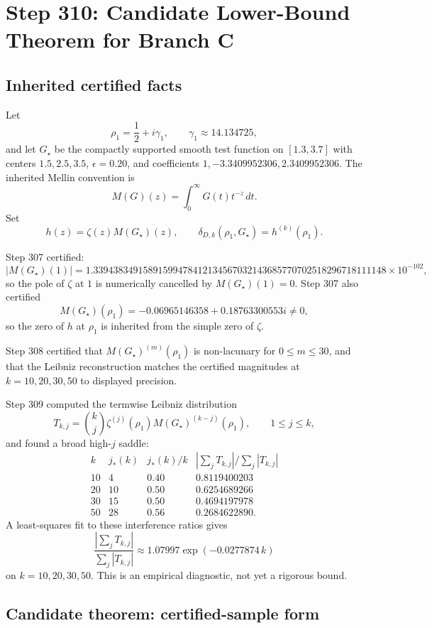 \section*{Step 310: Candidate Lower-Bound Theorem for Branch C}

\subsection*{Inherited certified facts}

Let
\[
  \rho_1 = \frac12+i\gamma_1,\qquad \gamma_1 \approx 14.134725,
\]
and let \(G_\star\) be the compactly supported smooth test function on
\([1.3,3.7]\) with centers \(1.5,2.5,3.5\), \(\epsilon=0.20\), and
coefficients \(1,-3.3409952306,2.3409952306\).  The inherited Mellin
convention is
\[
  M(G)(z)=\int_0^\infty G(t)t^{-z}\,dt.
\]
Set
\[
  h(z)=\zeta(z)M(G_\star)(z),\qquad
  \delta_{D,k}(\rho_1,G_\star)=h^{(k)}(\rho_1).
\]

Step 307 certified:
\[
  |M(G_\star)(1)|=
  1.33943834915891599478412134567032143685770702518296718111148
  \times 10^{-102},
\]
so the pole of \(\zeta\) at \(1\) is numerically cancelled by
\(M(G_\star)(1)=0\).  Step 307 also certified
\[
  M(G_\star)(\rho_1)=-0.06965146358+0.18763300553i\neq 0,
\]
so the zero of \(h\) at \(\rho_1\) is inherited from the simple zero of
\(\zeta\).

Step 308 certified that \(M(G_\star)^{(m)}(\rho_1)\) is non-lacunary for
\(0\le m\le 30\), and that the Leibniz reconstruction matches the
certified magnitudes at \(k=10,20,30,50\) to displayed precision.

Step 309 computed the termwise Leibniz distribution
\[
  T_{k,j}
  =
  {k\choose j}\zeta^{(j)}(\rho_1)M(G_\star)^{(k-j)}(\rho_1),
  \qquad 1\le j\le k,
\]
and found a broad high-\(j\) saddle:
\[
\begin{array}{c|c|c|c}
k & j_\ast(k) & j_\ast(k)/k
  & |\sum_jT_{k,j}|/\sum_j|T_{k,j}|\\
\hline
10&4&0.40&0.8119400203\\
20&10&0.50&0.6254689266\\
30&15&0.50&0.4694197978\\
50&28&0.56&0.2684622890.
\end{array}
\]
A least-squares fit to these interference ratios gives
\[
  \frac{|\sum_jT_{k,j}|}{\sum_j|T_{k,j}|}
  \approx 1.07997\exp(-0.0277874\,k)
\]
on \(k=10,20,30,50\).  This is an empirical diagnostic, not yet a
rigorous bound.

\subsection*{Candidate theorem: certified-sample form}

